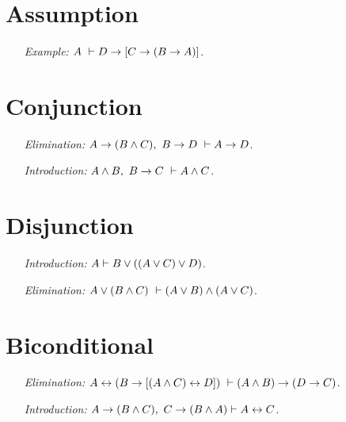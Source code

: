 \documentclass[a4paper, 11pt]{article} %
\begin{document}
\section*{Assumption}

\begin{enumerate}
  \item[\it Example:] $A\ \vdash D \rightarrow [C \rightarrow (B \rightarrow A)]$.
\end{enumerate}




\section*{Conjunction}

\begin{enumerate}
  \item[\it Elimination:] $A \rightarrow (B\wedge C),\ B \rightarrow D\ \vdash A \rightarrow D$.
  \item[\it Introduction:] $A \wedge B,\ B \rightarrow C\ \vdash A \wedge C$.
\end{enumerate}



\section*{Disjunction}

\begin{enumerate}
  \item[\it Introduction:] $A \vdash B \vee ((A \vee C) \vee D)$.
  \item[\it Elimination:] $A\vee(B\wedge C)\ \vdash (A \vee B) \wedge (A \vee C)$. 
\end{enumerate}







\section*{Biconditional}

\begin{enumerate}
  \item[\it Elimination:] $A \leftrightarrow (B \rightarrow [(A \wedge C)\leftrightarrow D])\ \vdash (A\wedge B) \rightarrow (D \rightarrow C)$. 
  \item[\it Introduction:] $A \rightarrow (B \wedge C),\ C \rightarrow (B \wedge A) \vdash A \leftrightarrow C$.
\end{enumerate}
\end{document}
